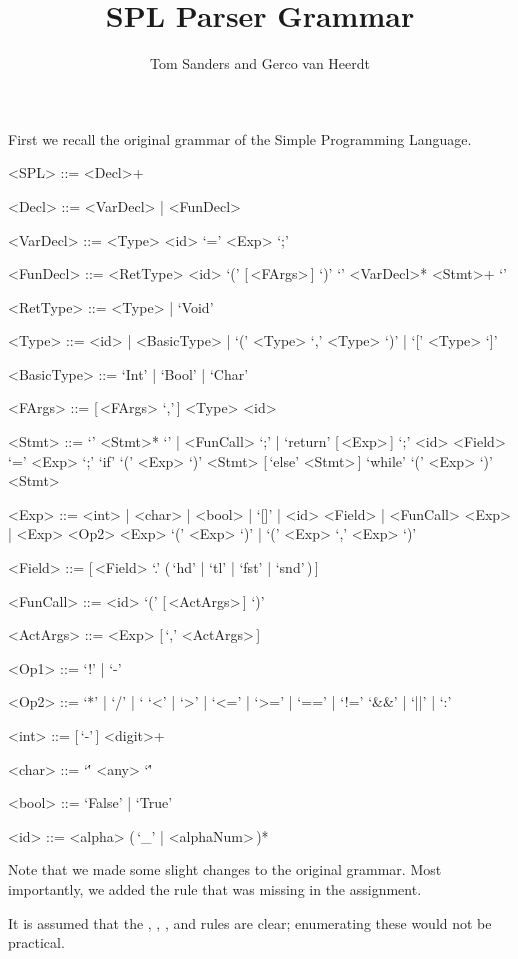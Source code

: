 \documentclass{article}
\title{SPL Parser Grammar}
\author{Tom Sanders and Gerco van Heerdt}
\begin{document}
\maketitle

First we recall the original grammar of the Simple Programming Language.
\setlength{\grammarindent}{6.8em}
\begin{grammar}
    <SPL> ::= <Decl>+

    <Decl> ::= <VarDecl> | <FunDecl>

    <VarDecl> ::= <Type> <id> `=' <Exp> `;'

    <FunDecl> ::= <RetType> <id> `(' [\,<FArgs>\,] `)' `{' <VarDecl>* <Stmt>+ `}'

    <RetType> ::= <Type> | `Void'

    <Type> ::= <id> | <BasicType> | `(' <Type> `,' <Type> `)' | `[' <Type> `]'

    <BasicType> ::= `Int' | `Bool' | `Char'

    <FArgs> ::= [\,<FArgs> `,'\,] <Type> <id>

    <Stmt> ::= `{' <Stmt>* `}' | <FunCall> `;' | `return' [\,<Exp>\,] `;'
    \alt <id> <Field> `=' <Exp> `;'
    \alt `if' `(' <Exp> `)' <Stmt> [\,`else' <Stmt>\,]
    \alt `while' `(' <Exp> `)' <Stmt>

    <Exp> ::= <int> | <char> | <bool> | `[]' | <id> <Field> | <FunCall>
     <Exp> | <Exp> <Op2> <Exp>
    \alt `(' <Exp> `)' | `(' <Exp> `,' <Exp> `)'

    <Field> ::= [\,<Field> `.' (\,`hd' | `tl' | `fst' | `snd'\,)\,]

    <FunCall> ::= <id> `(' [\,<ActArgs>\,] `)'

    <ActArgs> ::= <Exp> [\,`,' <ActArgs>\,]

    <Op1> ::= `!' | `-'

    <Op2> ::=  `*' | `/' | `%
    \alt `<' | `>' | `<=' | `>=' | `==' | `!='
    \alt `&&' | `||' | `:'

    <int> ::= [\,`-'\,] <digit>+

    <char> ::= `\'' <any> `\''

    <bool> ::= `False' | `True'

    <id> ::= <alpha> (\,`_' | <alphaNum>\,)*
\end{grammar}
Note that we made some slight changes to the original grammar.
Most importantly, we added the  rule that was missing in the assignment.

It is assumed that the , , , and  rules are clear; enumerating these would not be practical.
\end{document}
